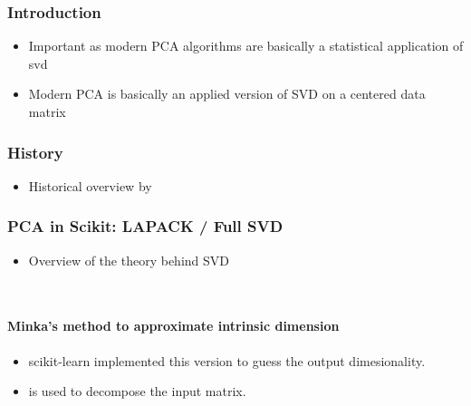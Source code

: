 \subsubsection{Introduction}

\begin{itemize}
	\item Important as modern PCA algorithms are basically a statistical application of \gls{svd}
	\item Modern PCA is basically an applied version of SVD on a centered data matrix
\end{itemize}

\clearpage



\subsubsection{History}

\begin{itemize}
	\item Historical overview by \cite{stewart1993early}
\end{itemize}

\clearpage



\subsubsection{PCA in Scikit: LAPACK / Full SVD}

\begin{itemize}
	\item Overview of the theory behind SVD
\end{itemize}

\ \clearpage
\ \clearpage


\paragraph{Minka's method to approximate intrinsic dimension}

\begin{itemize}
	\item scikit-learn implemented this version \cite{minka2000automatic} to guess the output dimesionality. 
	\item \cite{halko2011finding} is used to decompose the input matrix.
\end{itemize}

\ \clearpage

